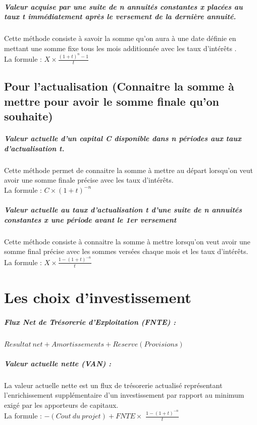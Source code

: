 \documentclass{report}
\begin{document}
\paragraph{Valeur acquise par une suite de n annuités constantes x placées au taux t immédiatement après le versement de la dernière annuité.}
Cette méthode consiste à savoir la somme qu'on aura à une date définie en mettant une somme fixe tous les mois additionnée avec les taux d'intérêts .
\\La formule : {\Large$X \times \frac{(1 + t)^{n} -1}{t}$}

\section{Pour l'actualisation (Connaitre la somme à mettre pour avoir le somme finale qu'on souhaite)}

\paragraph{Valeur actuelle d'un capital C disponible dans n périodes aux taux d'actualisation t.} 
Cette méthode permet de connaitre la somme à mettre au départ lorsqu'on veut avoir une somme finale précise avec les taux d'intérêts.
\\La formule : $C \times (1 + t)^{-n}$

\paragraph{Valeur actuelle au taux d'actualisation t d'une suite de n annuités constantes x une période avant le 1er versement}
Cette méthode consiste à connaitre la somme à mettre lorsqu'on veut avoir une somme final précise avec les sommes versées chaque mois et les taux d'intérêts.
\\La formule : {\Large $X \times \frac{1 - (1 + t)^{-n} }{t}$}

\chapter{Les choix d'investissement}

\paragraph{Flux Net de Trésorerie d'Exploitation (FNTE) :}
 $Resultat\ net + Amortissements + Reserve (Provisions)$
 
 \paragraph{Valeur actuelle nette (VAN) :}
La valeur actuelle nette est un flux de trésorerie actualisé représentant l'enrichissement supplémentaire d'un investissement par rapport au minimum exigé par les apporteurs de capitaux.
\\La formule : $- (Cout\ du\ projet) + FNTE \times$ {\Large $\frac{1 - (1 + t)^{-n}}{t}$} 
\end{document}
